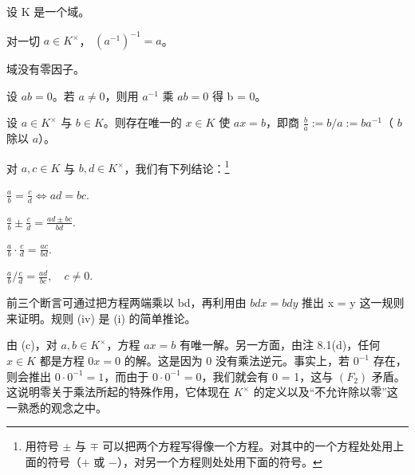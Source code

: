 \begin{remark}

设 K 是一个域。

\begin{items}
\item

对一切  $ a \in K^\times $， $ (a^{-1})^{-1} = a $。

\item

域没有零因子。

\proofhead
设  $ ab = 0 $。若  $ a \neq 0 $，则用  $ a^{-1} $ 乘  $ ab = 0 $ 得 b = 0。
\item

设  $ a \in K^\times $ 与  $ b \in K $。则存在唯一的  $ x \in K $ 使  $ ax = b $，即商  $ \frac{b}{a} := b/a := ba^{-1} $（ $ b $ 除以  $ a $）。

\item

对 $a, c \in K$ 与 $b, d \in K^\times$，我们有下列结论：\footnote{用符号 $\pm$ 与 $\mp$ 可以把两个方程写得像一个方程。对其中的一个方程处处用上面的符号（$+$ 或 $-$），对另一个方程则处处用下面的符号。}

\begin{subitems}
\item

$ \frac{a}{b} = \frac{c}{d} \iff ad = bc. $

\item

$ \frac{a}{b} \pm \frac{c}{d} = \frac{ad \pm bc}{bd} $.

\item

$ \frac{a}{b} \cdot \frac{c}{d} = \frac{ac}{bd} $.

\item

$ \frac{a}{b}\bigg/\frac{c}{d} = \frac{ad}{bc},\quad c \neq 0. $

\proofhead
前三个断言可通过把方程两端乘以 bd，再利用由  $ bdx = bdy $ 推出 x = y 这一规则来证明。规则 (iv) 是 (i) 的简单推论。
\end{subitems}

\item

由 (c)，对 $a, b \in K^\times$，方程 $ax = b$ 有唯一解。另一方面，由注 8.1(d)，任何 $x \in K$ 都是方程 $0x = 0$ 的解。这是因为 0 没有乘法逆元。事实上，若 $0^{-1}$ 存在，则会推出 $0 \cdot 0^{-1} = 1$，而由于 $0 \cdot 0^{-1} = 0$，我们就会有 0 = 1，这与 $(F_2)$ 矛盾。这说明零关于乘法所起的特殊作用，它体现在 $K^\times$ 的定义以及“不允许除以零”这一熟悉的观念之中。


\end{items}
\end{remark}
